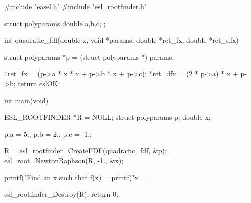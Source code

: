 \begin{cchunk}
#include "easel.h"
#include "esl_rootfinder.h"

struct polyparams { double a,b,c; };

int quadratic_fdf(double x, void *params, double *ret_fx, double *ret_dfx)
{
  struct polyparams *p = (struct polyparams *) params;
  
  *ret_fx  = (p->a * x * x + p->b * x + p->c);
  *ret_dfx =  (2 * p->a) * x + p->b;
  return eslOK;
}

int main(void)
{
  ESL_ROOTFINDER *R = NULL;
  struct polyparams p;
  double x;

  p.a = 5.;
  p.b = 2.;
  p.c = -1.;

  R = esl_rootfinder_CreateFDF(quadratic_fdf, &p);
  esl_root_NewtonRaphson(R, -1., &x);

  printf("Find an x such that f(x) = %
  printf("x = %

  esl_rootfinder_Destroy(R);
  return 0;
}
\end{cchunk}
